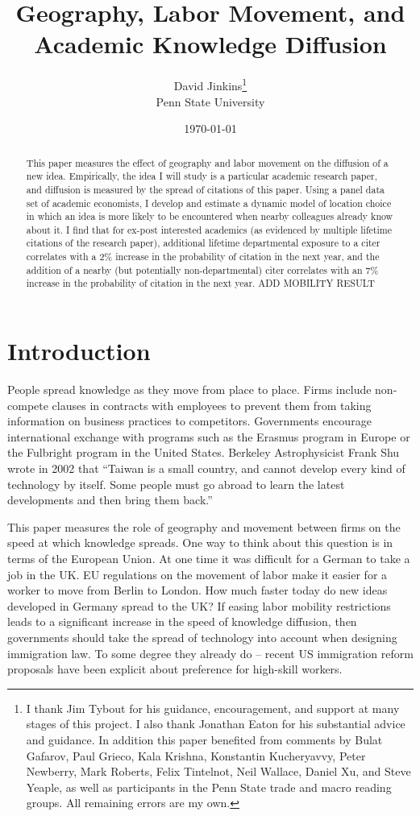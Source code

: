 \documentclass[]{article}
\title{Geography, Labor Movement, and Academic Knowledge Diffusion}
\author{David Jinkins\thanks{I thank Jim Tybout for his guidance, encouragement, and support at many stages of this project.  I also thank Jonathan Eaton for his substantial advice and guidance.  In addition this paper benefited from comments by Bulat Gafarov, Paul Grieco, Kala Krishna, Konstantin Kucheryavvy, Peter Newberry, Mark Roberts, Felix Tintelnot, Neil Wallace, Daniel Xu, and Steve Yeaple, as well as participants in the Penn State trade and macro reading groups.  All remaining errors are my own.}\\Penn State University}
\date{\today}
\begin{document}
\maketitle

\begin{abstract}
This paper measures the effect of geography and labor movement on the diffusion of a new idea.  Empirically, the idea I will study is a particular academic research paper, and diffusion is measured by the spread of citations of this paper.   Using a panel data set of academic economists, I develop and estimate a dynamic model of location choice in which an idea is more likely to be encountered when nearby colleagues already know about it.  I find that for ex-post interested academics (as evidenced by multiple lifetime citations of the research paper), additional lifetime departmental exposure to a citer correlates with a 2\% increase in the probability of citation in the next year, and the addition of a nearby (but potentially non-departmental) citer correlates with an 7\% increase in the probability of citation in the next year.  ADD MOBILITY RESULT\end{abstract}

\section{Introduction}

People spread knowledge as they move from place to place. Firms include
non-compete clauses in contracts with employees to prevent them from
taking information on business practices to competitors. Governments
encourage international exchange with programs such as the Erasmus
program in Europe or the Fulbright program in the United States.
Berkeley Astrophysicist Frank Shu wrote in 2002 that ``Taiwan is a small
country, and cannot develop every kind of technology by itself. Some
people must go abroad to learn the latest developments and then bring
them back.'' \citep{taiwanpanorama2002shu}

This paper measures the role of geography and  movement between firms on the speed at
which knowledge spreads. One way to think about this question is in
terms of the European Union. At one time it was difficult for a German
to take a job in the UK. EU regulations on the movement of labor make it
easier for a worker to move from Berlin to London. How much faster
today do new ideas developed in Germany spread to the UK? If easing
labor mobility restrictions leads to a significant increase in the speed
of knowledge diffusion, then governments should take the spread of
technology into account when designing immigration law. To some degree
they already do -- recent US immigration reform proposals have been
explicit about preference for high-skill workers.
\end{document}
